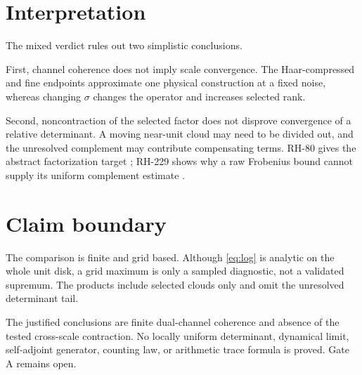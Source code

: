 \documentclass[11pt]{article}
\theoremstyle{remark}\newtheorem{remark}[theorem]{Remark}
\begin{document}
\section{Interpretation}

The mixed verdict rules out two simplistic conclusions.

First, channel coherence does not imply scale convergence. The Haar-compressed
and fine endpoints approximate one physical construction at a fixed noise,
whereas changing $\sigma$ changes the operator and increases selected rank.

Second, noncontraction of the selected factor does not disprove convergence
of a relative determinant. A moving near-unit cloud may need to be divided
out, and the unresolved complement may contribute compensating terms. RH-80
gives the abstract factorization target \citep{WangRH80}; RH-229 shows why a
raw Frobenius bound cannot supply its uniform complement estimate
\citep{WangRH229}.

\section{Claim boundary}

The comparison is finite and grid based. Although \eqref{eq:log} is analytic
on the whole unit disk, a grid maximum is only a sampled diagnostic, not a
validated supremum. The products include selected clouds only and omit the
unresolved determinant tail.

The justified conclusions are finite dual-channel coherence and absence of
the tested cross-scale contraction. No locally uniform determinant, dynamical
limit, self-adjoint generator, counting law, or arithmetic trace formula is
proved. Gate A remains open.



\end{document}
